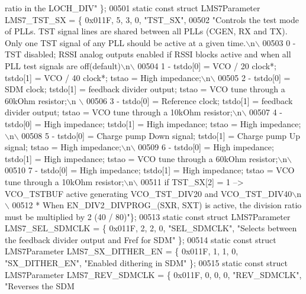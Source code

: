 \begin{DoxyCode}
{       ratio in the LOCH\_DIV"} \};
00501 \textcolor{keyword}{static} \textcolor{keyword}{const} \textcolor{keyword}{struct }LMS7Parameter LMS7_TST_SX = \{ 0x011F, 5, 3, 0, \textcolor{stringliteral}{"TST\_SX"},
00502 \textcolor{stringliteral}{"Controls the test mode of PLLs. TST signal lines are shared between all PLLs (CGEN, RX and TX). Only one
       TST signal of any PLL should be active at a given time.\(\backslash\)n\(\backslash\)}
00503 \textcolor{stringliteral}{0 - TST disabled; RSSI analog outputs enabled if RSSI blocks active and when all PLL test signals are
       off(default)\(\backslash\)n\(\backslash\)}
00504 \textcolor{stringliteral}{1 - tstdo[0] = VCO / 20 clock*; tstdo[1] = VCO / 40 clock*; tstao = High impedance;\(\backslash\)n\(\backslash\)}
00505 \textcolor{stringliteral}{2 - tstdo[0] = SDM clock; tstdo[1] = feedback divider output; tstao = VCO tune through a 60kOhm resistor;\(\backslash\)n
      \(\backslash\)}
00506 \textcolor{stringliteral}{3 - tstdo[0] = Reference clock; tstdo[1] = feedback divider output; tstao = VCO tune through a 10kOhm
       resistor;\(\backslash\)n\(\backslash\)}
00507 \textcolor{stringliteral}{4 - tstdo[0] = High impedance; tstdo[1] = High impedance; tstao = High impedance;\(\backslash\)n\(\backslash\)}
00508 \textcolor{stringliteral}{5 - tstdo[0] = Charge pump Down signal; tstdo[1] = Charge pump Up signal; tstao = High impedance;\(\backslash\)n\(\backslash\)}
00509 \textcolor{stringliteral}{6 - tstdo[0] = High impedance; tstdo[1] = High impedance; tstao = VCO tune through a 60kOhm resistor;\(\backslash\)n\(\backslash\)}
00510 \textcolor{stringliteral}{7 - tstdo[0] = High impedance; tstdo[1] = High impedance; tstao = VCO tune through a 10kOhm resistor;\(\backslash\)n\(\backslash\)}
00511 \textcolor{stringliteral}{if TST\_SX[2] = 1 --> VCO\_TSTBUF active generating VCO\_TST\_DIV20 and VCO\_TST\_DIV40\(\backslash\)n\(\backslash\)}
00512 \textcolor{stringliteral}{* When EN\_DIV2\_DIVPROG\_(SXR, SXT) is active, the division ratio must be multiplied by 2 (40 / 80)"}\};
00513 \textcolor{keyword}{static} \textcolor{keyword}{const} \textcolor{keyword}{struct }LMS7Parameter LMS7_SEL_SDMCLK = \{ 0x011F, 2, 2, 0, \textcolor{stringliteral}{"SEL\_SDMCLK"}, \textcolor{stringliteral}{"Selects between the
       feedback divider output and Fref for SDM"} \};
00514 \textcolor{keyword}{static} \textcolor{keyword}{const} \textcolor{keyword}{struct }LMS7Parameter LMS7_SX_DITHER_EN = \{ 0x011F, 1, 1, 0, \textcolor{stringliteral}{"SX\_DITHER\_EN"}, \textcolor{stringliteral}{"Enabled dithering
       in SDM"} \};
00515 \textcolor{keyword}{static} \textcolor{keyword}{const} \textcolor{keyword}{struct }LMS7Parameter LMS7_REV_SDMCLK = \{ 0x011F, 0, 0, 0, \textcolor{stringliteral}{"REV\_SDMCLK"}, \textcolor{stringliteral}{"Reverses the SDM
}
\end{DoxyCode}
